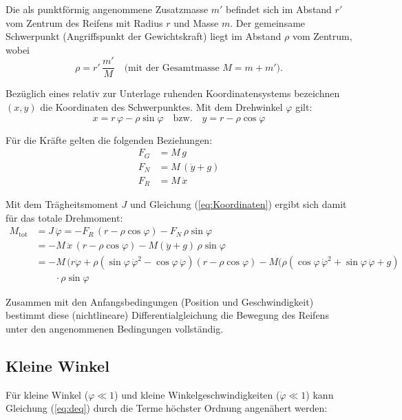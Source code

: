 \documentclass[11pt,a4paper]{article} %
\begin{document}
Die als punktförmig angenommene Zusatzmasse $m'$ befindet sich im Abstand $r'$ vom Zentrum des Reifens mit Radius $r$ und Masse $m$. Der gemeinsame Schwerpunkt (Angriffspunkt der Gewichtskraft) liegt im Abstand $\rho$ vom Zentrum, wobei
\begin{equation}
\rho=r'\,\frac{m'}{M}\quad\text{(mit der Gesamtmasse $M=m+m'$).}
\end{equation}

Bezüglich eines relativ zur Unterlage ruhenden Koordinatensystems bezeichnen $(x,y)$ die Koordinaten des  Schwerpunktes. Mit dem Drehwinkel $\varphi$ gilt:
\begin{equation}\label{eq:Koordinaten}
x=r\,\varphi - \rho\sin\varphi\quad\text{bzw.}\quad y=r-\rho\cos\varphi
\end{equation}

Für die Kräfte gelten die folgenden Beziehungen:
\begin{align}
F_G 		& = 	M\,g			\label{eq:FG}\\
F_N		& =	M\,(\ddot y+g)	\label{eq:FN}\\
F_R		& =	M\,\ddot x		\label{eq:FR}
\end{align}

Mit dem Trägheitsmoment $J$ und Gleichung (\ref{eq:Koordinaten}) ergibt sich damit für das totale Drehmoment:
\begin{equation}
\begin{split}\label{eq:deq}
M_\text{{tot}} 	& =  J\,\ddot\varphi = - F_R \, (r-\rho\cos\varphi)-F_N\, \rho\sin\varphi\\
						& =  -M\, \ddot x \, (r-\rho\cos\varphi)-M(\ddot y+g)\, \rho\sin\varphi\\
						& = -M\,(r\ddot\varphi+\rho (\sin\varphi\,\dot\varphi^2-\cos\varphi\, \ddot\varphi)(r-\rho\cos\varphi)-M(\rho(\cos\varphi\,\dot\varphi^2+\sin\varphi\,\ddot\varphi+g)\\
						& \qquad\cdot \rho\sin\varphi				
\end{split}\end{equation}

Zusammen mit den Anfangsbedingungen (Position und Geschwindigkeit) bestimmt diese (nichtlineare) Differentialgleichung die Bewegung des Reifens unter den angenommenen Bedingungen vollständig.


\subsection{Kleine Winkel}

Für kleine Winkel ($\varphi\ll 1$) und kleine Winkelgeschwindigkeiten ($\dot\varphi\ll 1$) kann Gleichung (\ref{eq:deq}) durch die Terme höchster Ordnung angenähert werden:
\end{document}
